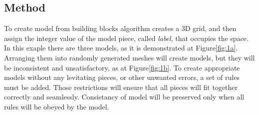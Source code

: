 \documentclass[b5paper,twoside,11pt]{article}
\renewcommand{\figurename}{Figure}
\begin{document}
 \subsection{Method}
To create model from building blocks algorithm creates a 3D grid, and then assign the integer value of the model piece, called \textit{label}, that occupies the space. In this exaple there are three models, as it is demonstrated at \figurename\ref{fig:1a}.
Arranging them into randomly generated meshes will create models, but they will be inconsistent and unsatisfactory, as at \figurename\ref{fig:1b}. To create appropriate models without any levitating pieces, or other unwanted errors, a set of rules must be added. Those restrictions will ensure that all pieces will fit together correctly and seamlessly. Consistancy of model will be preserved only when all rules will be obeyed by the model.
\end{document}
